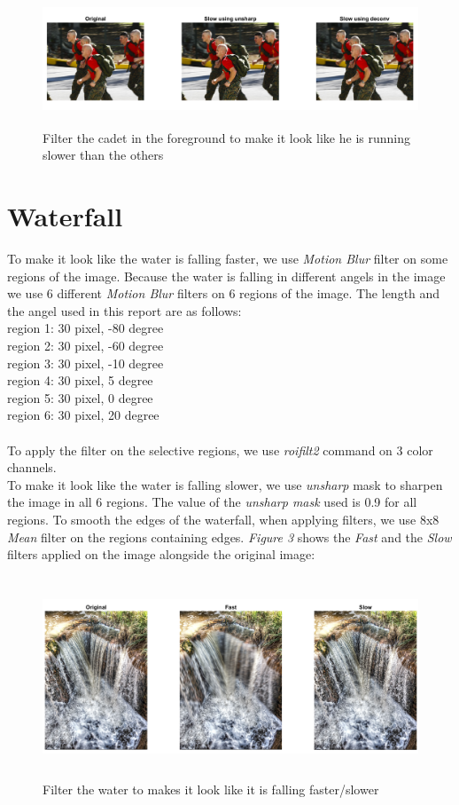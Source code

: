 \documentclass[a4paper,11pt]{article}
\begin{document}
\begin{figure}[!htb]
  \centering
  \includegraphics[width=16cm, height=4cm]{2.png}
  \caption{\small Filter the cadet in the foreground to make it look like he is running slower than the others}
\end{figure}

\newpage
\section*{Waterfall}
To make it look like the water is falling faster, we use \emph{Motion Blur} filter on some regions of the image. Because the water is falling in different angels in the image we use 6 different \emph{Motion Blur} filters on 6 regions of the image. The length and the angel used in this report are as follows: \\
region 1: 30 pixel, -80 degree \\
region 2: 30 pixel, -60 degree \\
region 3: 30 pixel, -10 degree \\
region 4: 30 pixel, 5 degree \\
region 5: 30 pixel, 0 degree \\
region 6: 30 pixel, 20 degree \\
\\
To apply the filter on the selective regions, we use \emph{roifilt2} command on 3 color channels. \\
To make it look like the water is falling slower, we use \emph{unsharp} mask to sharpen the image in all 6 regions. The value of the \emph{unsharp mask} used is 0.9 for all regions. To smooth the edges of the waterfall, when applying filters, we use 8x8 \emph{Mean} filter on the regions containing edges. \emph{Figure 3} shows the \emph{Fast} and the \emph{Slow} filters applied on the image alongside the original image:

\begin{figure}[!htb]
  \centering
  \includegraphics[width=16cm, height=6cm]{3.png}
  \caption{\small Filter the water to makes it look like it is falling faster/slower}
\end{figure}
\end{document}
